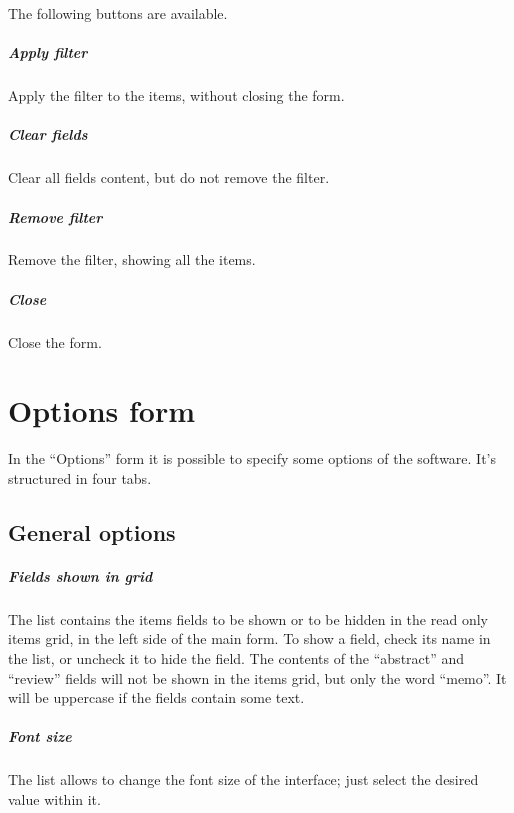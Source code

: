 \documentclass[a4paper,12pt]{report}
\begin{document}
The following buttons are available.

\paragraph{Apply filter} Apply the filter to the items, without closing the form.

\paragraph{Clear fields} Clear all fields content, but do not remove the filter.

\paragraph{Remove filter} Remove the filter, showing all the items.

\paragraph{Close} Close the form.

\chapter{Options form}

In the “Options” form it is possible to specify some options of the software. It's structured in four tabs.

\section{General options}

\paragraph{Fields shown in grid} The list contains the items fields to be shown or to be hidden in the read only items grid, in the left side of the main form. To show a field, check its name in the list, or uncheck it to hide the field. The contents of the “abstract” and “review” fields will not be shown in the items grid, but only the word “memo”. It will be uppercase if the fields contain some text.

\paragraph{Font size} The list allows to change the font size of the interface; just select the desired value within it.
\end{document}
